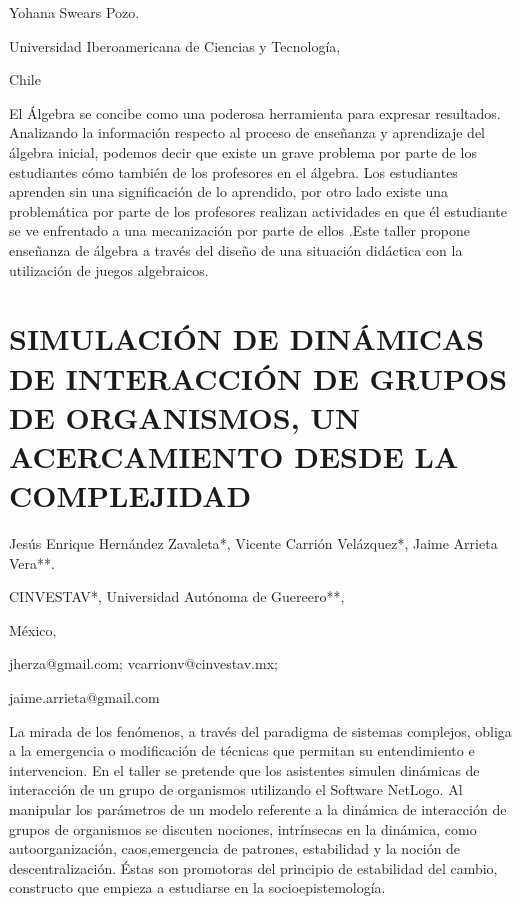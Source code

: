 \begin{datos}

Yohana Swears Pozo.

Universidad Iberoamericana de Ciencias y Tecnología,

Chile

\end{datos}

El Álgebra se concibe como una poderosa herramienta para expresar
resultados. Analizando la información respecto al proceso de enseñanza
y aprendizaje del álgebra inicial, podemos decir que existe un grave
problema por parte de los estudiantes cómo también de los profesores
en el álgebra. Los estudiantes aprenden sin una significación de lo
aprendido, por otro lado existe una problemática por parte de los
profesores realizan actividades en que él estudiante se ve enfrentado
a una mecanización por parte de ellos .Este taller propone enseñanza
de álgebra a través del diseño de una situación didáctica con la utilización
de juegos algebraicos. 


\section{SIMULACIÓN DE DINÁMICAS DE INTERACCIÓN DE GRUPOS DE ORGANISMOS, UN
ACERCAMIENTO DESDE LA COMPLEJIDAD}

\begin{datos}

Jesús Enrique Hernández Zavaleta{*}, Vicente Carrión Velázquez{*},
Jaime Arrieta Vera{*}{*}.

CINVESTAV{*}, Universidad Autónoma de Guereero{*}{*}, 

México,

jherza@gmail.com; vcarrionv@cinvestav.mx;

jaime.arrieta@gmail.com

\end{datos}

La mirada de los fenómenos, a través del paradigma de sistemas complejos,
obliga a la emergencia o modificación de técnicas que permitan su
entendimiento e intervencion. En el taller se pretende que los asistentes
simulen dinámicas de interacción de un grupo de organismos utilizando
el Software NetLogo. Al manipular los parámetros de un modelo referente
a la dinámica de interacción de grupos de organismos se discuten nociones,
intrínsecas en la dinámica, como autoorganización, caos,emergencia
de patrones, estabilidad y la noción de descentralización. Éstas son
promotoras del principio de estabilidad del cambio, constructo que
empieza a estudiarse en la socioepistemología. 


